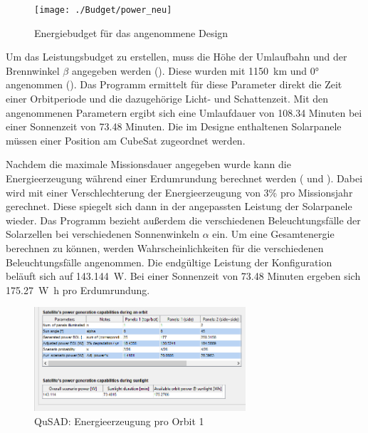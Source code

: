										\begin{figure}[H]
											\centering
												\texttt{[image: ./Budget/power\_neu]}
											\caption{Energiebudget für das angenommene Design}
											\label{fig:power}
										\end{figure}
Um das Leistungsbudget zu erstellen, muss die Höhe der Umlaufbahn und der Brennwinkel $\beta$ angegeben werden (). Diese wurden mit \SI{1150}{\kilo\metre} und \num{0}° angenommen ().  Das Programm ermittelt für diese Parameter direkt die Zeit einer Orbitperiode und die dazugehörige Licht- und Schattenzeit. Mit den angenommenen Parametern ergibt sich eine Umlaufdauer von \num{108,34} Minuten bei einer Sonnenzeit von \num{73,48} Minuten. Die im Designe enthaltenen Solarpanele müssen einer Position am CubeSat zugeordnet werden.

Nachdem die maximale Missionsdauer angegeben wurde kann die Energieerzeugung während einer Erdumrundung berechnet werden ( und ). Dabei wird mit einer  Verschlechterung der Energieerzeugung von \num{3}\% pro Missionsjahr gerechnet. Diese spiegelt sich dann in der angepassten Leistung der Solarpanele wieder. Das Programm bezieht außerdem die verschiedenen Beleuchtungsfälle der Solarzellen bei verschiedenen Sonnenwinkeln $\alpha$ ein. Um eine Gesamtenergie berechnen zu können,  werden Wahrscheinlichkeiten für die verschiedenen Beleuchtungsfälle angenommen. Die endgültige Leistung der Konfiguration beläuft sich auf \SI{143,144}{\watt}. Bei einer Sonnenzeit von \num{73,48} Minuten ergeben sich \SI{175,27}{\watt\hour} pro Erdumrundung. 
			
			\begin{figure}[H]
				\centering
					\includegraphics[width=0.70\textwidth]{graphics/power3.png}
				\caption{QuSAD: Energieerzeugung pro Orbit 1}
				\label{fig:power3}
			\end{figure}
			
